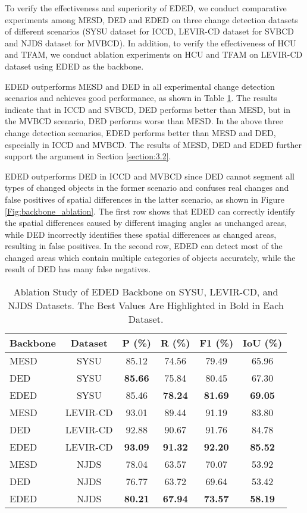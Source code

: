 \documentclass[journal]{IEEEtran}
\begin{document}
To verify the effectiveness and superiority of EDED, we conduct comparative experiments among MESD, DED and EDED on three change detection datasets of different scenarios (SYSU dataset for ICCD, LEVIR-CD dataset for SVBCD and NJDS dataset for MVBCD). In addition, to verify the effectiveness of HCU and TFAM, we conduct ablation experiments on HCU and TFAM on LEVIR-CD dataset using EDED as the backbone.

EDED outperforms MESD and DED in all experimental change detection scenarios and achieves good performance, as shown in Table \ref{backbone_ablation}. The results indicate that in ICCD and SVBCD, DED performs better than MESD, but in the MVBCD scenario, DED performs worse than MESD. In the above three change detection scenarios, EDED performs better than MESD and DED, especially in ICCD and MVBCD. The results of MESD, DED and EDED further support the argument in Section \ref{section:3.2}.

EDED outperforms DED in ICCD and MVBCD since DED cannot segment all types of changed objects in the former scenario and confuses real changes and false positives of spatial differences in the latter scenario, as shown in Figure \ref{Fig:backbone_ablation}. The first row shows that EDED can correctly identify the spatial differences caused by different imaging angles as unchanged areas, while DED incorrectly identifies these spatial differences as changed areas, resulting in false positives. In the second row, EDED can detect most of the changed areas which contain multiple categories of objects accurately, while the result of DED has many false negatives.

\begin{table}[!ht]
\caption{Ablation Study of EDED Backbone on SYSU, LEVIR-CD, and NJDS Datasets. The Best Values Are Highlighted in Bold in Each Dataset.
}
\label{backbone_ablation}
\centering
\begin{tabular}{lccccc}
\toprule
Backbone & Dataset & P (\%) & R (\%) & F1 (\%) & IoU (\%) \\
\midrule
MESD & SYSU & 85.12 & 74.56 & 79.49 & 65.96\\
DED & SYSU & \textbf{85.66} & 75.84 & 80.45 & 67.30\\
EDED & SYSU & 85.46 & \textbf{78.24} & \textbf{81.69} & \textbf{69.05}\\
\midrule
MESD & LEVIR-CD & 93.01 & 89.44 & 91.19 & 83.80\\
DED & LEVIR-CD & 92.88 & 90.67 & 91.76 & 84.78 \\
EDED & LEVIR-CD & \textbf{93.09} & \textbf{91.32} & \textbf{92.20} & \textbf{85.52}\\
\midrule
MESD & NJDS & 78.04 & 63.57 & 70.07 & 53.92\\
DED & NJDS & 76.77 & 63.72 & 69.64 & 53.42\\
EDED & NJDS & \textbf{80.21} & \textbf{67.94} & \textbf{73.57} & \textbf{58.19}\\
\bottomrule
\end{tabular}
\end{table}
\end{document}
